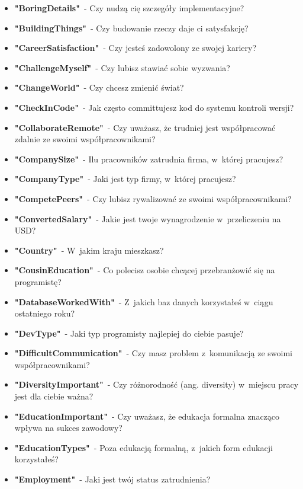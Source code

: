 \begin{appendices}
\begin{itemize}
        \item \textbf{"BoringDetails"}~- Czy nudzą cię szczegóły implementacyjne?
        \item \textbf{"BuildingThings"}~- Czy budowanie rzeczy daje ci satysfakcję?
        \item \textbf{"CareerSatisfaction"}~- Czy jesteś zadowolony ze swojej kariery?
        \item \textbf{"ChallengeMyself"}~- Czy lubisz stawiać sobie wyzwania?
        \item \textbf{"ChangeWorld"}~- Czy chcesz zmienić świat?
        \item \textbf{"CheckInCode"}~- Jak często committujesz kod do systemu kontroli wersji?
        \item \textbf{"CollaborateRemote"}~- Czy uważasz, że trudniej jest współpracować zdalnie ze swoimi współpracownikami?
        \item \textbf{"CompanySize"}~- Ilu pracowników zatrudnia firma, w~której pracujesz?
        \item \textbf{"CompanyType"}~- Jaki jest typ firmy, w~której pracujesz?
        \item \textbf{"CompetePeers"}~- Czy lubisz rywalizować ze swoimi współpracownikami?
        \item \textbf{"ConvertedSalary"}~- Jakie jest twoje wynagrodzenie w~przeliczeniu na USD?
        \item \textbf{"Country"}~- W~jakim kraju mieszkasz?
        \item \textbf{"CousinEducation"}~- Co polecisz osobie chcącej przebranżowić się na programistę?
        \item \textbf{"DatabaseWorkedWith"}~- Z~jakich baz danych korzystałeś w~ciągu ostatniego roku?
        \item \textbf{"DevType"}~- Jaki typ programisty najlepiej do ciebie pasuje?
        \item \textbf{"DifficultCommunication"}~- Czy masz problem z~komunikacją ze swoimi współpracownikami?
        \item \textbf{"DiversityImportant"}~- Czy różnorodność (ang. diversity) w~miejscu pracy jest dla ciebie ważna?
        \item \textbf{"EducationImportant"}~- Czy uważasz, że edukacja formalna znacząco wpływa na sukces zawodowy?
        \item \textbf{"EducationTypes"}~- Poza edukacją formalną, z~jakich form edukacji korzystałeś?
        \item \textbf{"Employment"}~- Jaki jest twój status zatrudnienia?

\end{itemize}
\end{appendices}

